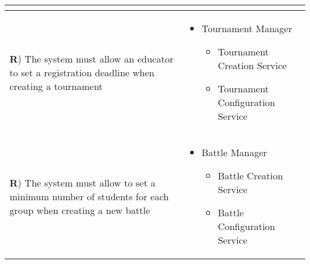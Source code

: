 \documentclass[../DD.tex]{subfiles}
\newcounter{rown}
\newcommand{\rowIndex}{\arabic{rown}\stepcounter{rown}}
\begin{document}
\begin{table}[h!]
\begin{center}
\begin{tabular}{|m{20em}|m{20em}|}
\begin{itemize}
            \end{itemize}\\
            \hline
            \textbf{R\rowIndex}) The system must allow an educator to set a registration deadline when creating a tournament & \begin{itemize}
                \item Tournament Manager
                \begin{itemize}
                    \item Tournament Creation Service
                    \item Tournament Configuration Service
                \end{itemize}
            \end{itemize}\\
            \hline
            \textbf{R\rowIndex}) The system must allow to set a minimum number of students for each group when creating a new battle & \begin{itemize}
                \item Battle Manager
                \begin{itemize}
                    \item Battle Creation Service
                    \item Battle Configuration Service
                \end{itemize}
            \end{itemize}\\
            \hline
            \end{tabular}
        \end{center}
    \end{table}
    \newpage
\end{document}
